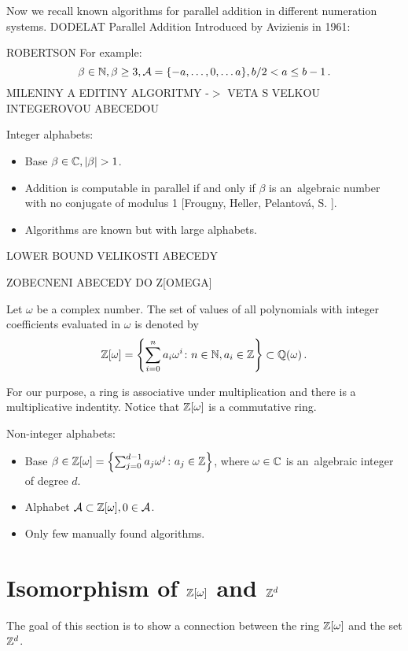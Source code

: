 Now we recall known algorithms for parallel addition in different numeration systems. 
DODELAT 
    {Parallel Addition}
    Introduced by Avizienis in 1961:
  
  ROBERTSON
  For example:
  $$
  \beta \in \mathbb{N}, \beta \geq 3, \mathcal{A}=\{-a, \dots, 0, \dots a\}, b/2 <a \leq b-1\,. 
  $$  
  MILENINY A EDITINY ALGORITMY -$>$ VETA S VELKOU INTEGEROVOU ABECEDOU
  
    Integer alphabets:
    \begin{itemize}
        \item Base $\beta \in \CC, |\beta|>1$.
        
        \item Addition is computable in parallel if and only if $\beta$ is an~algebraic number with no conjugate of modulus 1 [Frougny, Heller, Pelantov\'a, S. ].
        
        \item Algorithms are known but with large alphabets.
    \end{itemize}  
  LOWER BOUND VELIKOSTI ABECEDY
  
ZOBECNENI ABECEDY DO Z[OMEGA]   
\begin{defn}
Let $\omega$ be a complex number. The set of values of all polynomials with integer coefficients evaluated in $\omega$ is denoted by
$$
    \mathbb{Z}[\omega] =\left\{\sum_{i=0}^n a_i \omega^i\colon n\in\mathbb{N}, a_i\in\mathbb{Z} \right\} \subset \mathbb{Q}(\omega)\,.
$$
\end{defn}
For our purpose, a ring is associative under multiplication and there is a multiplicative indentity. Notice that $\mathbb{Z}[\omega]$ is a commutative ring.     
    
    Non-integer alphabets:
    \begin{itemize}
        \item Base $\beta \in \mathbb{Z}[\omega]= \left\{\sum_{j=0}^{d-1} a_j \omega^j \colon a_j \in \mathbb{Z} \right\}$, where $\omega \in \mathbb{C}$ is an~algebraic integer of degree $d$.
        
        \item Alphabet $\mathcal{A} \subset \mathbb{Z}[\omega] , 0\in \mathcal{A}$.
        
        \item Only few manually found algorithms. 
        
        
    \end{itemize}
  


\section{\texorpdfstring{Isomorphism of $\mathbb{Z}[\omega]$ and $\mathbb{Z}^{d}$}{Isomorphism of Z[omega] and Zd}}
The goal of this section is to show a connection between the ring $\mathbb{Z}[\omega]$ and the set $\mathbb{Z}^d$. %

